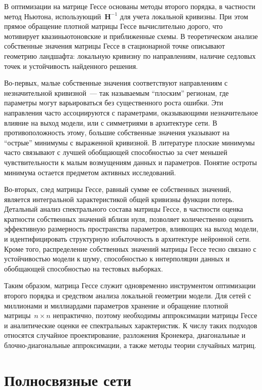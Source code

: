 В оптимизации на матрице Гессе основаны методы второго порядка, в частности метод Ньютона, использующий~$\mathbf{H}^{-1}$ для учета локальной кривизны. При этом прямое обращение плотной матрицы Гессе вычислительно дорого, что мотивирует квазиньютоновские и приближенные схемы.
В теоретическом анализе собственные значения матрицы Гессе в стационарной точке описывают геометрию ландшафта: локальную кривизну по направлениям, наличие седловых точек и устойчивость найденного решения.

Во-первых, малые собственные значения соответствуют направлениям с незначительной кривизной~--- так называемым ``плоским'' регионам, где параметры могут варьироваться без существенного роста ошибки. Эти направления часто ассоциируются с параметрами, оказывающими незначительное влияние на выход модели, или с симметриями в архитектуре сети. В противоположность этому, большие собственные значения указывают на ``острые'' минимумы с выраженной кривизной. В литературе плоские минимумы часто связывают с лучшей обобщающей способностью за счет меньшей чувствительности к малым возмущениям данных и параметров. Понятие остроты минимума остается предметом активных исследований.

Во-вторых, след матрицы Гессе, равный сумме ее собственных значений, является интегральной характеристикой общей кривизны функции потерь. Детальный анализ спектрального состава матрицы Гессе, в частности оценка кратности собственных значений вблизи нуля, позволяет количественно оценить эффективную размерность пространства параметров, влияющих на выход модели, и идентифицировать структурную избыточность в архитектуре нейронной сети. Кроме того, распределение собственных значений матрицы Гессе тесно связано с устойчивостью модели к шуму, способностью к интерполяции данных и обобщающей способностью на тестовых выборках.

Таким образом, матрица Гессе служит одновременно инструментом оптимизации второго порядка и средством анализа локальной геометрии модели.
Для сетей с миллионами и миллиардами параметров хранение и обращение плотной матрицы~$n \times n$ непрактично, поэтому необходимы аппроксимации матрицы Гессе и аналитические оценки ее спектральных характеристик.
К числу таких подходов относятся случайное проектирование, разложения Кронекера, диагональные и блочно-диагональные аппроксимации, а также методы теории случайных матриц.

\section{Полносвязные сети}

